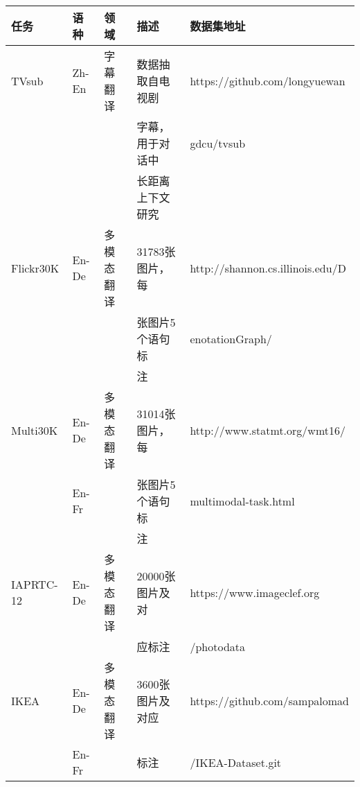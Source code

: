 \begin{appendices}
\begin{table}[htp]{
\footnotesize
\begin{center}
\begin{tabular}{p{1.6cm} | p{1.2cm} p{1.6cm} p{2.6cm} p{3.9cm}}
\rule{0pt}{15pt}{任务} & {语种} &{领域} &{描述} &{数据集地址} \\
\hline
\rule{0pt}{15pt}TVsub & Zh-En & 字幕翻译 & 数据抽取自电视剧 & {https://github.com/longyuewan} \\
 &   &   & 字幕，用于对话中 & gdcu/tvsub \\
 &   &  & 长距离上下文研究 & \\
\rule{0pt}{15pt}Flickr30K & En-De & 多模态翻译 & 31783张图片，每 & {http://shannon.cs.illinois.edu/D} \\
 & &  & 张图片5个语句标 & enotationGraph/ \\
 &   &  & 注 & \\
\rule{0pt}{15pt}Multi30K  & En-De & 多模态翻译 & 31014张图片，每 & {http://www.statmt.org/wmt16/} \\
 &  En-Fr &  & 张图片5个语句标 & multimodal-task.html \\
 &   &  & 注 & \\
\rule{0pt}{15pt}IAPRTC-12 & En-De & 多模态翻译 & 20000张图片及对 & {https://www.imageclef.org} \\
 &   &  & 应标注  & /photodata \\
\rule{0pt}{15pt}IKEA & En-De & 多模态翻译 & 3600张图片及对应  & {https://github.com/sampalomad} \\
 &  En-Fr &  & 标注 & /IKEA-Dataset.git \\
\end{tabular}
\end{center}
}\end{table}



\end{appendices}
